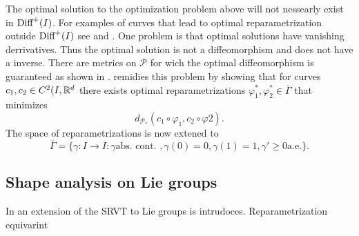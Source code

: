 The optimal solution to the optimization problem above will not nessearly exist in \(\text{Diff}^+( I )\). For examples of curves that lead to optimal reparametrization outside \(\text{Diff}^+( I )\) see \cite[p.11]{bauer2015why} and \cite[3.2]{woien2019}. One problem is that optimal solutions  have vanishing derrivatives. Thus the optimal solution is not a diffeomorphism and does not have a inverse. There are metrics on \(\mathcal{P}\) for wich the optimal diffeomorphism is guaranteed as shown in \cite{bauer2014overview}.  \citeauthor{bruveris1016_srvtexample} \cite{bruveris1016_srvtexample}  remidies this problem by showing that for curves \(c_1, c_2 \in C^2(I,\mathbb{R}^d\) there exists optimal reparametrizations \(\varphi_1^*, \varphi_2^* \in \overline{ \Gamma}\) that minimizes
\begin{equation}
  d_{\mathcal{P}_*}(c_1 \circ \varphi_1, c_2 \circ \varphi2). 
\end{equation}
The space of reparametrizations is now extened to 
\begin{equation}
  \overline \Gamma = \{\gamma : I \rightarrow I : \gamma \text{abs. cont. }, \gamma(0) = 0, \gamma(1) = 1, \gamma' \geq 0 \text{a.e.}\}.
\end{equation}

\subsection{Shape analysis on Lie groups}\label{subsec:shape-lie}
In \cite{celledoni2016} an extension of the SRVT to Lie groups is intrudoces. 
Reparametrization equivarint 

